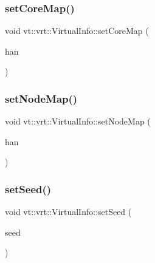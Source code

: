 \mbox{\label{structvt_1_1vrt_1_1_virtual_info_ad2bc75966ac3a5c7faaf14bfe47b5ba4}} 
\subsubsection{\texorpdfstring{set\+Core\+Map()}{setCoreMap()}}
{\footnotesize\ttfamily void vt\+::vrt\+::\+Virtual\+Info\+::set\+Core\+Map (\begin{DoxyParamCaption}\item[{\hyperlink{namespacevt_af64846b57dfcaf104da3ef6967917573}{Handler\+Type} const}]{han }\end{DoxyParamCaption})\hspace{0.3cm}{\ttfamily [inline]}}

\mbox{\label{structvt_1_1vrt_1_1_virtual_info_acb0b673b07b17b8eb83a91168e6c5658}} 
\subsubsection{\texorpdfstring{set\+Node\+Map()}{setNodeMap()}}
{\footnotesize\ttfamily void vt\+::vrt\+::\+Virtual\+Info\+::set\+Node\+Map (\begin{DoxyParamCaption}\item[{\hyperlink{namespacevt_af64846b57dfcaf104da3ef6967917573}{Handler\+Type} const}]{han }\end{DoxyParamCaption})\hspace{0.3cm}{\ttfamily [inline]}}

\mbox{\label{structvt_1_1vrt_1_1_virtual_info_a5c90fa0c4f42e6e80552a66403137d3f}} 
\subsubsection{\texorpdfstring{set\+Seed()}{setSeed()}}
{\footnotesize\ttfamily void vt\+::vrt\+::\+Virtual\+Info\+::set\+Seed (\begin{DoxyParamCaption}\item[{\hyperlink{namespacevt_ae2e13198bdef4d5b8e603d6c1c7f0969}{Seed\+Type} const}]{seed }\end{DoxyParamCaption})\hspace{0.3cm}{\ttfamily [inline]}}

